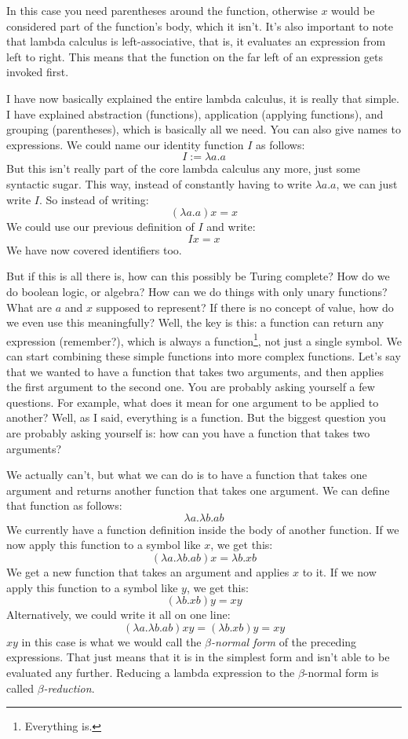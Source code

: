 \documentclass[11pt]{article}
\begin{document}
In this case you need parentheses around the function, otherwise \(x\) would be
considered part of the function's body, which it isn't. It's also important to
note that lambda calculus is left-associative, that is, it evaluates an
expression from left to right. This means that the function on the far left of
an expression gets invoked first.

I have now basically explained the entire lambda calculus, it is really that
simple. I have explained abstraction (functions), application (applying
functions), and grouping (parentheses), which is basically all we need. You
can also give names to expressions. We could name our identity function \(I\)
as follows: \[I:=\lambda a.a\] But this isn't really part of the core lambda
calculus any more, just some syntactic sugar. This way, instead of constantly
having to write \(\lambda a.a\), we can just write \(I\). So instead of
writing: \[(\lambda a.a)x=x\] We could use our previous definition of \(I\) and
write: \[Ix=x\] We have now covered identifiers too.

But if this is all there is, how can this possibly be Turing complete? How do
we do boolean logic, or algebra? How can we do things with only unary
functions? What are \(a\) and \(x\) supposed to represent? If there is no
concept of value, how do we even use this meaningfully? Well, the key is this:
a function can return any expression (remember?), which is always a
function\footnote{Everything is.}, not just a single symbol. We can start
combining these simple functions into more complex functions. Let's say that we
wanted to have a function that takes two arguments, and then applies the first
argument to the second one. You are probably asking yourself a few questions.
For example, what does it mean for one argument to be applied to another? Well,
as I said, everything is a function. But the biggest question you are probably
asking yourself is: how can you have a function that takes two arguments?

We actually can't, but what we can do is to have a function that takes one
argument and returns another function that takes one argument. We can define
that function as follows:
\[\lambda a.\lambda b.ab\]
We currently have a function definition inside the body of another function. If
we now apply this function to a symbol like \(x\), we get this:
\[(\lambda a.\lambda b.ab)x=\lambda b.xb\]
We get a new function that takes an argument and applies \(x\) to it. If we now
apply this function to a symbol like \(y\), we get this:
\[(\lambda b.xb)y=xy\]
Alternatively, we could write it all on one line:
\[(\lambda a.\lambda b.ab)xy=(\lambda b.xb)y=xy\]
\(xy\) in this case is what we would call the \emph{\(\beta\)-normal form} of
the preceding expressions. That just means that it is in the simplest form and
isn't able to be evaluated any further. Reducing a lambda expression to the
\(\beta\)-normal form is called \emph{\(\beta\)-reduction}.
\end{document}
